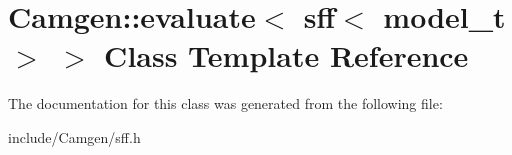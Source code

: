 \hypertarget{a00191}{}\section{Camgen\+:\+:evaluate$<$ sff$<$ model\+\_\+t $>$ $>$ Class Template Reference}
\label{a00191}


The documentation for this class was generated from the following file\+:\begin{DoxyCompactItemize}
\item 
include/\+Camgen/sff.\+h\end{DoxyCompactItemize}
